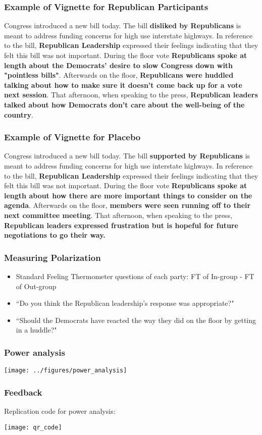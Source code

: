 \documentclass[aspectratio=1610]{beamer}
\begin{document}
	\begin{frame}[allowframebreaks]
		\frametitle{Example of Vignette for Republican Participants}
	Congress introduced a new bill today. The bill \textbf{disliked by Republicans} is meant to address funding concerns for high use interstate highways. In reference to the bill, \textbf{Republican Leadership} expressed their feelings indicating that they felt this bill was not important. During the floor vote \textbf{Republicans spoke at length about the Democrats' desire to slow Congress down with "pointless bills"}. Afterwards on the floor, \textbf{Republicans were huddled talking about how to make sure it doesn't come back up for a vote next session}. That afternoon, when speaking to the press, \textbf{Republican leaders talked about how Democrats don't care about the well-being of the country}.
	\end{frame}
	\begin{frame}[allowframebreaks]
		\frametitle{Example of Vignette for Placebo}
		Congress introduced a new bill today. The bill \textbf{supported by Republicans} is meant to address funding concerns for high use interstate highways. In reference to the bill, \textbf{Republican Leadership} expressed their feelings indicating that they felt this bill was not important. During the floor vote \textbf{Republicans spoke at length about how there are more important things to consider on the agenda}. Afterwards on the floor, \textbf{members were seen running off to their next committee meeting}. That afternoon, when speaking to the press, \textbf{Republican leaders expressed frustration but is hopeful for future negotiations to go their way.}
	\end{frame}
	\begin{frame}
		\frametitle{Measuring Polarization}
		\begin{itemize}
			\item Standard Feeling Thermometer questions of each party: FT of In-group - FT of Out-group
			\item ``Do you think the Republican leadership's response was appropriate?"
			\item ``Should the Democrats have reacted the way they did on the floor by getting in a huddle?"
		\end{itemize}
	\end{frame}
	\begin{frame}
		\frametitle{Power analysis}
		\texttt{[image: ../figures/power\_analysis]}	
	\end{frame}

	\begin{frame}
		\frametitle{Feedback}
		Replication code for power analysis: 
		
		\texttt{[image: qr\_code]}
	\end{frame}
\end{document}
